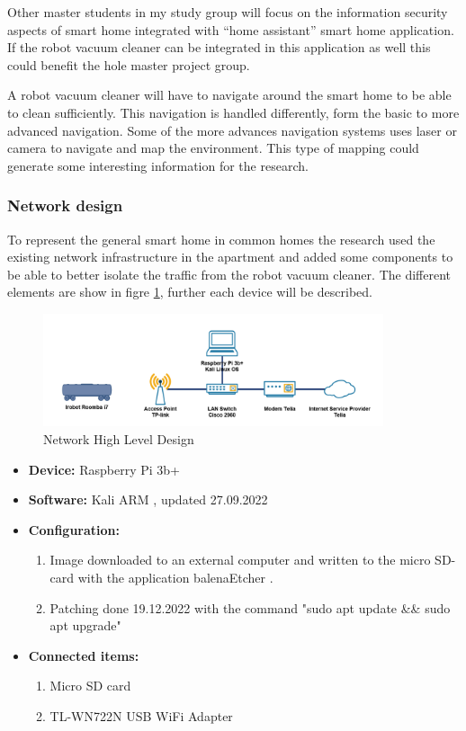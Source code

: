 Other master students in my study group will focus on the information security aspects of smart home integrated with “home assistant” smart home application. If the robot vacuum cleaner can be integrated in this application as well this could benefit the hole master project group. \cite{robotsel7}

A robot vacuum cleaner will have to navigate around the smart home to be able to clean sufficiently. This navigation is handled differently, form the basic to more advanced navigation. Some of the more advances navigation systems uses laser or camera to navigate and map the environment. \cite{robotsel5} \cite{robotsel6} This type of mapping could generate some interesting information for the research. 

\subsubsection{Network design}
To represent the general smart home in common homes the research used the existing network infrastructure in the apartment and added some components to be able to better isolate the traffic from the robot vacuum cleaner. The different elements are show in figre \ref{fig:HLD}, further each device will be described. 

\begin{figure}[!ht]
    \centering
    \includegraphics[width=10cm]{figures/HLD.png}
    \caption{Network High Level Design}
    \label{fig:HLD}
\end{figure}

\begin{itemize}
    \item \textbf{Device:} Raspberry Pi 3b+
    \item \textbf{Software:} Kali ARM \cite{kalidownload}, updated 27.09.2022
    \item \textbf{Configuration:}
    \begin{enumerate}
        \item Image downloaded to an external computer and written to the micro SD-card with the application balenaEtcher \cite{balenaetcherdownload}.
        \item Patching done 19.12.2022 with the command "sudo apt update \&\& sudo apt upgrade"
    \end{enumerate}
    \item \textbf{Connected items:}
    \begin{enumerate}
        \item Micro SD card \cite{microsdcard}
        \item TL-WN722N USB WiFi Adapter \cite{tp-link}
    \end{enumerate}
\end{itemize}

